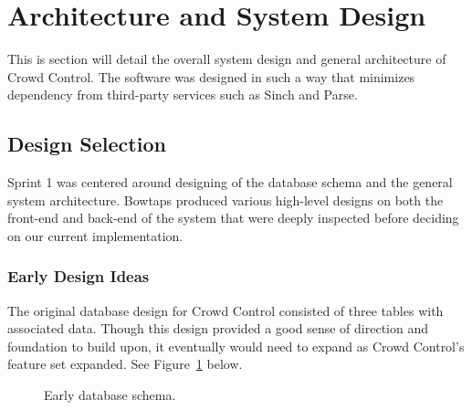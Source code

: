  \section{Architecture and System Design}
 This is section will detail the overall system design and general architecture of Crowd Control. The software was designed in such a way that minimizes dependency from third-party services such as Sinch and Parse.
 
 \subsection{Design Selection}
Sprint 1 was centered around designing of the database schema and the general system architecture. Bowtaps produced various high-level designs on both the front-end and back-end of the system that were deeply inspected before deciding on our current implementation.

\subsubsection{Early Design Ideas}
The original database design for Crowd Control consisted of three tables with associated data. Though this design provided a good sense of direction and foundation to build upon, it eventually would need to expand as Crowd Control's feature set expanded. See Figure~\ref{EarlyDBSchema} below.

	\begin{figure}[tbh]
	\begin{center}
	\end{center}
	\caption{Early database schema. \label{EarlyDBSchema}}
	\end{figure}

